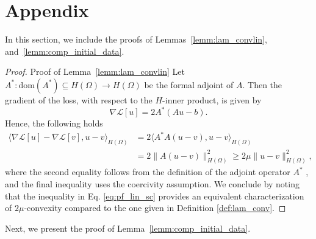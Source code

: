 \documentclass[pdflatex]{sn-jnl}%
\begin{document}
\section{Appendix}\label{appendix_B}
In this section, we include the proofs of Lemmas~\ref{lemm:lam_convlin}, and~\ref{lemm:comp_initial_data}. 
\vspace{-0em}\begin{proof}{Proof of Lemma~\ref{lemm:lam_convlin}}
      Let $A^*:\mathrm{dom}(A^*)\subseteq H(\Omega)\rightarrow H(\Omega)$ be the formal adjoint of $A$. Then the gradient of the loss, with respect to the $H$-inner product, is given by
    \begin{equation}
        \nabla\mathcal{L}[u] = 2A^*(Au-b).
    \end{equation}
    Hence, the following holds
    \begin{equation}\label{eq:pf_lin_sc}
            \begin{aligned}
        \langle \nabla\mathcal{L}[u]-\nabla\mathcal{L}[v],u-v \rangle_{H(\Omega)} &= 2\langle A^*A(u-v),u-v \rangle_{H(\Omega)}\\&
        = 2\| A(u-v)\|_{H(\Omega)}^2\geq 2\mu \|u-v\|_{H(\Omega)}^2,
    \end{aligned}
    \end{equation}
    where the second equality follows from the definition of the adjoint operator $A^*$ , and the final inequality uses the coercivity assumption. We conclude by noting that the inequality in Eq. \ref{eq:pf_lin_sc} provides an equivalent characterization of $2\mu$-convexity compared to the one given in Definition \ref{def:lam_conv}.
\end{proof}
Next, we present the proof of Lemma~\ref{lemm:comp_initial_data}.
\end{document}
